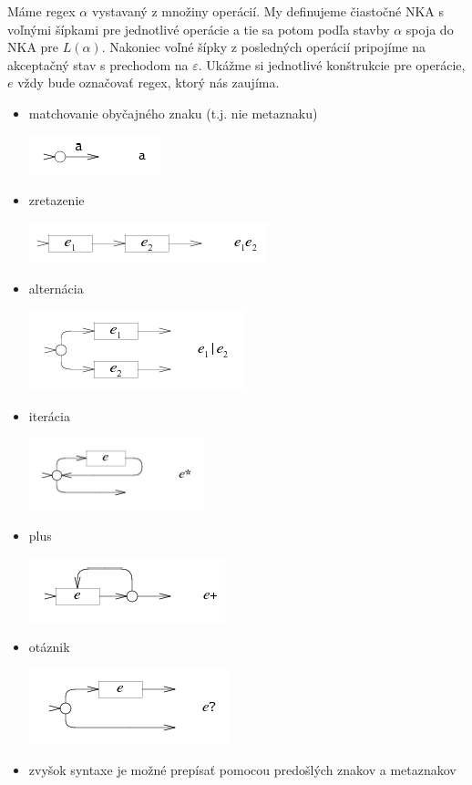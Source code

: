 Máme regex $\alpha$ vystavaný z množiny operácií. My definujeme čiastočné NKA s voľnými šípkami pre jednotlivé operácie a tie sa potom podľa stavby $\alpha$ spoja do NKA pre $L(\alpha )$. Nakoniec voľné šípky z posledných operácií pripojíme na akceptačný stav s prechodom na $\varepsilon$. Ukážme si jednotlivé konštrukcie pre operácie, $e$ vždy bude označovať regex, ktorý nás zaujíma.
\begin{itemize}
\item matchovanie obyčajného znaku (t.j. nie metaznaku)
\begin{center}
	 \includegraphics[scale=1]{obrazky/T_pismenko}
\end{center}
\item zretazenie
\begin{center}
    \includegraphics[scale=1]{obrazky/T_zretazenie}
\end{center} 
\item alternácia
\begin{center}
    \includegraphics[scale = 1]{obrazky/T_alternacia}
\end{center}
\item iterácia
\begin{center}
    \includegraphics[width=0.40\textwidth]{obrazky/T_iteracia}
\end{center}
\item plus
\begin{center}
    \includegraphics[scale=1]{obrazky/T_plus}
\end{center}
\item otáznik
\begin{center}
    \includegraphics[scale=1]{obrazky/T_otaznik}
\end{center}
\item zvyšok syntaxe je možné prepísať pomocou predošlých znakov a metaznakov
\end{itemize}
